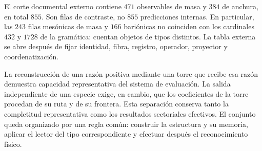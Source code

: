 El corte documental externo contiene \(471\) observables de masa y
\(384\) de anchura, en total \(855\). Son filas de contraste, no
\(855\) predicciones internas. En particular, las \(243\) filas
mesónicas de masa y \(166\) bariónicas no coinciden con los cardinales
\(432\) y \(1728\) de la gramática: cuentan objetos de tipos distintos.
La tabla externa se abre después de fijar identidad, fibra, registro,
operador, proyector y coordenatización.

La reconstrucción de una razón positiva mediante una torre que recibe
esa razón demuestra capacidad representativa del sistema de evaluación.
La salida independiente de una especie exige, en cambio, que los
coeficientes de la torre procedan de su ruta y de su frontera. Esta
separación conserva tanto la completitud representativa como los
resultados sectoriales efectivos. El conjunto queda organizado por una
regla común: construir la estructura y su memoria, aplicar el lector
del tipo correspondiente y efectuar después el reconocimiento físico.
